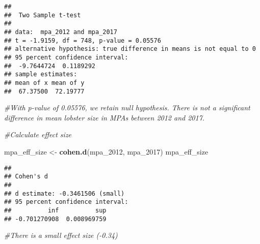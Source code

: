 \documentclass[]{article}
\newenvironment{Shaded}{\begin{snugshade}}{\end{snugshade}}
\newcommand{\KeywordTok}[1]{\textcolor[rgb]{0.13,0.29,0.53}{\textbf{#1}}}
\newcommand{\DataTypeTok}[1]{\textcolor[rgb]{0.13,0.29,0.53}{#1}}
\newcommand{\DecValTok}[1]{\textcolor[rgb]{0.00,0.00,0.81}{#1}}
\newcommand{\StringTok}[1]{\textcolor[rgb]{0.31,0.60,0.02}{#1}}
\newcommand{\CommentTok}[1]{\textcolor[rgb]{0.56,0.35,0.01}{\textit{#1}}}
\newcommand{\OperatorTok}[1]{\textcolor[rgb]{0.81,0.36,0.00}{\textbf{#1}}}
\newcommand{\NormalTok}[1]{#1}
\begin{document}
\begin{verbatim}
## 
##  Two Sample t-test
## 
## data:  mpa_2012 and mpa_2017
## t = -1.9159, df = 748, p-value = 0.05576
## alternative hypothesis: true difference in means is not equal to 0
## 95 percent confidence interval:
##  -9.7644724  0.1189292
## sample estimates:
## mean of x mean of y 
##  67.37500  72.19777
\end{verbatim}

\begin{Shaded}
\begin{Highlighting}[]
\CommentTok{#With p-value of 0.05576, we retain null hypothesis. There is not a significant difference in mean lobster size in MPAs between 2012 and 2017.}

\CommentTok{#Calculate effect size}

\NormalTok{mpa_eff_size <-}\StringTok{ }\KeywordTok{cohen.d}\NormalTok{(mpa_}\DecValTok{2012}\NormalTok{, mpa_}\DecValTok{2017}\NormalTok{)}
\NormalTok{mpa_eff_size}
\end{Highlighting}
\end{Shaded}

\begin{verbatim}
## 
## Cohen's d
## 
## d estimate: -0.3461506 (small)
## 95 percent confidence interval:
##          inf          sup 
## -0.701270908  0.008969759
\end{verbatim}

\begin{Shaded}
\begin{Highlighting}[]
\CommentTok{#There is a small effect size (-0.34)}
\end{Highlighting}
\end{Shaded}

\begin{Shaded}
\end{Shaded}
\end{document}

